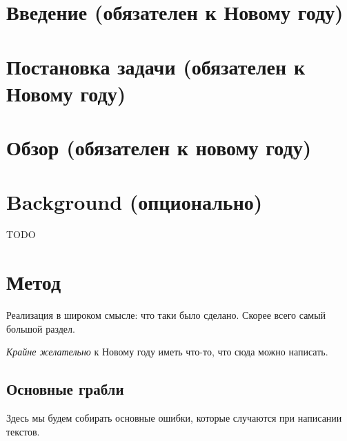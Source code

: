 


\usepackage{caption}
\usepackage{listings}




\maketitle
\setcounter{tocdepth}{2}
\tableofcontents


\section{Введение (обязателен к Новому году)}


\section{Постановка задачи (обязателен к Новому году)}
\label{sec:task}


\section{Обзор (обязателен к новому году)}


\section{Background (опционально)}
TODO


\section{Метод}
Реализация в широком смысле: что таки было сделано. Скорее всего самый большой раздел.

\emph{Крайне желательно} к Новому году иметь что-то, что сюда можно написать.


\subsection{Основные грабли}
Здесь мы будем собирать основные ошибки, которые случаются при написании текстов.


